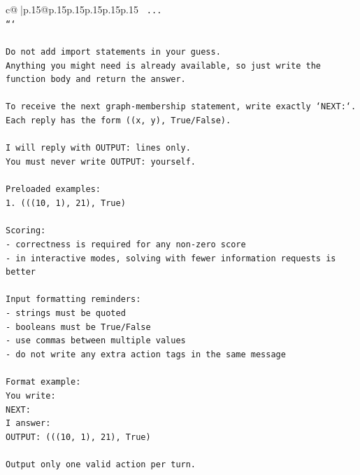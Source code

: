 \documentclass{article}
\begin{document}
{\begin{supertabular}{c@{$\;$}|p{.15\linewidth}@{}p{.15\linewidth}p{.15\linewidth}p{.15\linewidth}p{.15\linewidth}p{.15\linewidth}}
{{{\texttt{    ...} \\
\texttt{```} \\
\\ 
\texttt{Do not add import statements in your guess.} \\
\texttt{Anything you might need is already available, so just write the function body and return the answer.} \\
\\ 
\texttt{To receive the next graph{-}membership statement, write exactly `NEXT:`.} \\
\texttt{Each reply has the form ((x, y), True/False).} \\
\\ 
\texttt{I will reply with OUTPUT: lines only.} \\
\texttt{You must never write OUTPUT: yourself.} \\
\\ 
\texttt{Preloaded examples:} \\
\texttt{1. (((10, 1), 21), True)} \\
\\ 
\texttt{Scoring:} \\
\texttt{{-} correctness is required for any non{-}zero score} \\
\texttt{{-} in interactive modes, solving with fewer information requests is better} \\
\\ 
\texttt{Input formatting reminders:} \\
\texttt{{-} strings must be quoted} \\
\texttt{{-} booleans must be True/False} \\
\texttt{{-} use commas between multiple values} \\
\texttt{{-} do not write any extra action tags in the same message} \\
\\ 
\texttt{Format example:} \\
\texttt{You write:} \\
\texttt{NEXT:} \\
\texttt{I answer:} \\
\texttt{OUTPUT: (((10, 1), 21), True)} \\
\\ 
\texttt{Output only one valid action per turn.} \\
            }
        }
    }
     \\ \\


\end{supertabular}}
\end{document}
